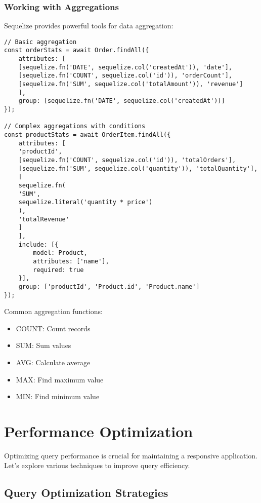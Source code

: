 \documentclass[12pt,a4paper]{book}
\begin{document}
	\subsubsection{Working with Aggregations}
	Sequelize provides powerful tools for data aggregation:
	
	\begin{tcolorbox}[title=Common Aggregation Functions]
		\begin{verbatim}
// Basic aggregation
const orderStats = await Order.findAll({
	attributes: [
	[sequelize.fn('DATE', sequelize.col('createdAt')), 'date'],
	[sequelize.fn('COUNT', sequelize.col('id')), 'orderCount'],
	[sequelize.fn('SUM', sequelize.col('totalAmount')), 'revenue']
	],
	group: [sequelize.fn('DATE', sequelize.col('createdAt'))]
});

// Complex aggregations with conditions
const productStats = await OrderItem.findAll({
	attributes: [
	'productId',
	[sequelize.fn('COUNT', sequelize.col('id')), 'totalOrders'],
	[sequelize.fn('SUM', sequelize.col('quantity')), 'totalQuantity'],
	[
	sequelize.fn(
	'SUM', 
	sequelize.literal('quantity * price')
	), 
	'totalRevenue'
	]
	],
	include: [{
		model: Product,
		attributes: ['name'],
		required: true
	}],
	group: ['productId', 'Product.id', 'Product.name']
});
		\end{verbatim}
		
		Common aggregation functions:
		\begin{itemize}
			\item COUNT: Count records
			\item SUM: Sum values
			\item AVG: Calculate average
			\item MAX: Find maximum value
			\item MIN: Find minimum value
		\end{itemize}
	\end{tcolorbox}
	
	\section{Performance Optimization}
	Optimizing query performance is crucial for maintaining a responsive application. Let's explore various techniques to improve query efficiency.
	
	\subsection{Query Optimization Strategies}
	
\end{document}
